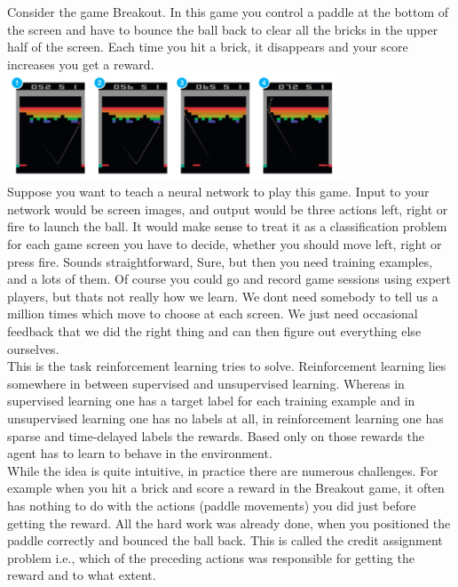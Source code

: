 \documentclass[twoside,letterpaper]{article}
\begin{document}
{\color{black}
Consider the game Breakout. In this game you control a paddle at the bottom of the screen and have to bounce the ball back to clear all the bricks in the upper half of the screen. Each time you hit a brick, it disappears and your score increases you get a reward.\\

\centering
\includegraphics[width=10cm]{images/breakout.png}\\
Suppose you want to teach a neural network to play this game. Input to your network would be screen images, and output would be three actions left, right or fire to launch the ball. It would make sense to treat it as a classification problem for each game screen you have to decide, whether you should move left, right or press fire. Sounds straightforward, Sure, but then you need training examples, and a lots of them. Of course you could go and record game sessions using expert players, but thats not really how we learn. We dont need somebody to tell us a million times which move to choose at each screen. We just need occasional feedback that we did the right thing and can then figure out everything else ourselves.\\
\bigskip
This is the task reinforcement learning tries to solve. Reinforcement learning lies somewhere in between supervised and unsupervised learning. Whereas in supervised learning one has a target label for each training example and in unsupervised learning one has no labels at all, in reinforcement learning one has sparse and time-delayed labels  the rewards. Based only on those rewards the agent has to learn to behave in the environment.\\
\bigskip
While the idea is quite intuitive, in practice there are numerous challenges. For example when you hit a brick and score a reward in the Breakout game, it often has nothing to do with the actions (paddle movements) you did just before getting the reward. All the hard work was already done, when you positioned the paddle correctly and bounced the ball back. This is called the credit assignment problem i.e., which of the preceding actions was responsible for getting the reward and to what extent.\\
}
\end{document}
